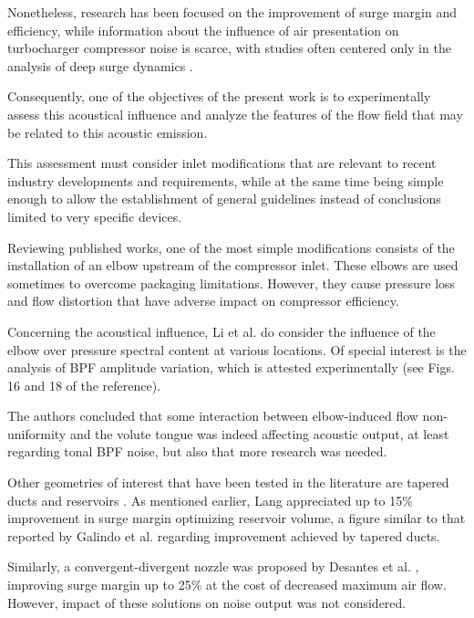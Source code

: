 Nonetheless, research has been focused on the improvement of surge margin and efficiency, while information about the influence of air presentation on turbocharger compressor noise is scarce, with  studies often centered only in the analysis of deep surge dynamics  \cite{greitzer1976surge,hansen1981experimental}.

Consequently, one of the objectives of the present work is to experimentally assess this acoustical influence and analyze the features of the flow field that may be related to this acoustic emission. 

This assessment must consider inlet modifications that are relevant to recent industry developments and requirements, while at the same time being simple enough to allow the establishment of general guidelines instead of conclusions limited to very specific devices.

Reviewing published works, one of the most simple modifications consists of the installation of an elbow upstream of the compressor inlet. These elbows are used sometimes to overcome packaging limitations. However, they cause pressure loss \cite{engeda2003inlet,li2012numerical} and flow distortion \cite{serrano2013optimization} that have adverse impact on compressor efficiency.

Concerning the acoustical influence, Li et al. \cite{li2012numerical} do consider the influence of the elbow over pressure spectral content at various locations. Of special interest is the analysis of BPF amplitude variation, which is attested experimentally (see Figs. 16 and 18 of the reference). 

The authors concluded that some interaction between elbow-induced flow non-uniformity and the volute tongue was indeed affecting acoustic output, at least regarding tonal BPF noise, but also that more research was needed.

Other geometries of interest that have been tested in the literature are tapered ducts \cite{galindo2011measurement,lang2011contribucion} and reservoirs \cite{lang2011contribucion}. As mentioned earlier, Lang appreciated up to 15\% improvement in surge margin optimizing reservoir volume, a figure similar to that reported by Galindo et al. \cite{galindo2011measurement} regarding improvement achieved by tapered ducts. 

Similarly, a convergent-divergent nozzle was proposed by Desantes et al. \cite{desantes2011potential}, improving surge margin up to 25\% at the cost of decreased maximum air flow. However, impact of these solutions on noise output was not considered.

